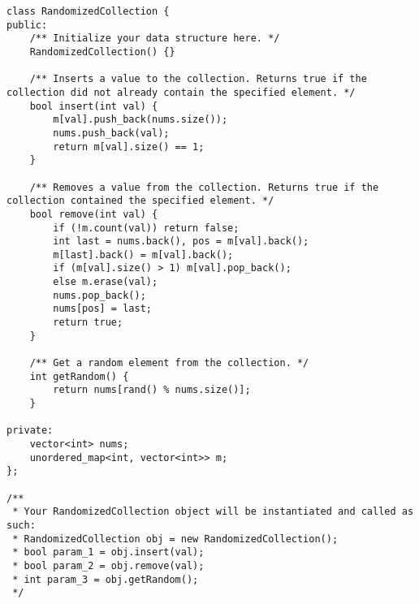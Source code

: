 \begin{lstlisting}
class RandomizedCollection {
public:
    /** Initialize your data structure here. */
    RandomizedCollection() {}
    
    /** Inserts a value to the collection. Returns true if the collection did not already contain the specified element. */
    bool insert(int val) {
        m[val].push_back(nums.size());
        nums.push_back(val);
        return m[val].size() == 1;
    }
    
    /** Removes a value from the collection. Returns true if the collection contained the specified element. */
    bool remove(int val) {
        if (!m.count(val)) return false;
        int last = nums.back(), pos = m[val].back(); 
        m[last].back() = m[val].back();
        if (m[val].size() > 1) m[val].pop_back();
        else m.erase(val);
        nums.pop_back();
        nums[pos] = last;
        return true;
    }
    
    /** Get a random element from the collection. */
    int getRandom() {
        return nums[rand() % nums.size()];
    }
    
private:
    vector<int> nums;
    unordered_map<int, vector<int>> m;
};

/**
 * Your RandomizedCollection object will be instantiated and called as such:
 * RandomizedCollection obj = new RandomizedCollection();
 * bool param_1 = obj.insert(val);
 * bool param_2 = obj.remove(val);
 * int param_3 = obj.getRandom();
 */
\end{lstlisting}
